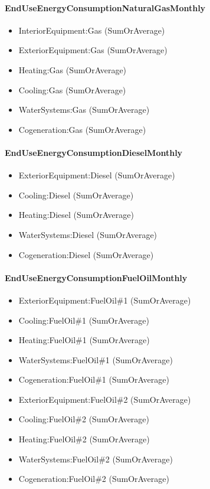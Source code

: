 \paragraph{EndUseEnergyConsumptionNaturalGasMonthly}\label{enduseenergyconsumptionnaturalgasmonthly}

\begin{itemize}
\item
  InteriorEquipment:Gas (SumOrAverage)
\item
  ExteriorEquipment:Gas (SumOrAverage)
\item
  Heating:Gas (SumOrAverage)
\item
  Cooling:Gas (SumOrAverage)
\item
  WaterSystems:Gas (SumOrAverage)
\item
  Cogeneration:Gas (SumOrAverage)
\end{itemize}

\paragraph{EndUseEnergyConsumptionDieselMonthly}\label{enduseenergyconsumptiondieselmonthly}

\begin{itemize}
\item
  ExteriorEquipment:Diesel (SumOrAverage)
\item
  Cooling:Diesel (SumOrAverage)
\item
  Heating:Diesel (SumOrAverage)
\item
  WaterSystems:Diesel (SumOrAverage)
\item
  Cogeneration:Diesel (SumOrAverage)
\end{itemize}

\paragraph{EndUseEnergyConsumptionFuelOilMonthly}\label{enduseenergyconsumptionfueloilmonthly}

\begin{itemize}
\item
  ExteriorEquipment:FuelOil\#1 (SumOrAverage)
\item
  Cooling:FuelOil\#1 (SumOrAverage)
\item
  Heating:FuelOil\#1 (SumOrAverage)
\item
  WaterSystems:FuelOil\#1 (SumOrAverage)
\item
  Cogeneration:FuelOil\#1 (SumOrAverage)
\item
  ExteriorEquipment:FuelOil\#2 (SumOrAverage)
\item
  Cooling:FuelOil\#2 (SumOrAverage)
\item
  Heating:FuelOil\#2 (SumOrAverage)
\item
  WaterSystems:FuelOil\#2 (SumOrAverage)
\item
  Cogeneration:FuelOil\#2 (SumOrAverage)
\end{itemize}

